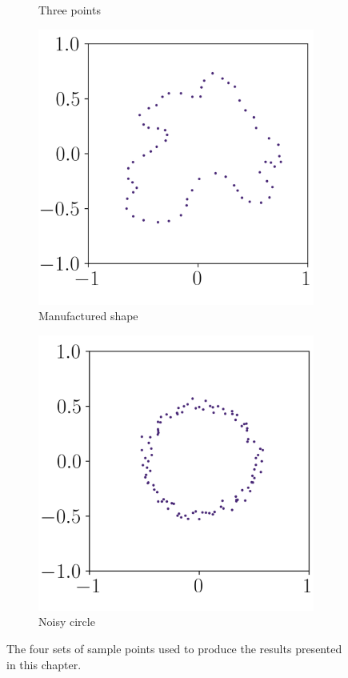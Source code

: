 \begin{figure}
\begin{subfigure}[h]{0.25\linewidth}
    \caption{Three points}
    \label{fig:test-case-few} 
    \vspace{1em}
  \end{subfigure} 
  \begin{subfigure}[h]{0.25\linewidth}
    \centering
    \includegraphics[width=0.9\linewidth]{figures/TestCases/Manypoints.png} 
    \caption{Manufactured shape}
    \label{fig:test-case-many} 
  \end{subfigure}%
  \begin{subfigure}[h]{0.25\linewidth}
    \centering
    \includegraphics[width=0.9\linewidth]{figures/TestCases/Noisypoints.png}
    \caption{Noisy circle}
    \label{fig:test-case-noisy} 
    \vspace{1em}
  \end{subfigure} 
  \caption[All Test Cases]{The four sets of sample points used to produce the results presented in this chapter.}
  \label{fig:test-cases} 
\end{figure}

